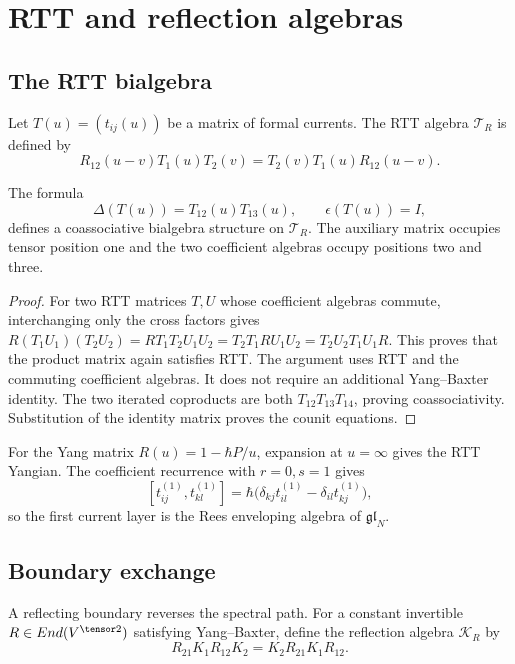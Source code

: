 \chapter{RTT and reflection algebras}
\section{The RTT bialgebra}
Let $T(u)=(t_{ij}(u))$ be a matrix of formal currents.  The RTT algebra $\mathcal T_R$ is defined by
\begin{equation}\label{eq:vol1-rtt-general}
 R_{12}(u-v)T_1(u)T_2(v)
 =T_2(v)T_1(u)R_{12}(u-v).
\end{equation}

\begin{theorem}
The formula
\[
 \Delta(T(u))=T_{12}(u)T_{13}(u),
 \qquad \epsilon(T(u))=I,
\]
defines a coassociative bialgebra structure on $\mathcal T_R$.
The auxiliary matrix occupies tensor position one and the two coefficient algebras occupy positions two and three.
\end{theorem}
\begin{proof}
For two RTT matrices $T,U$ whose coefficient algebras commute, interchanging only the cross factors gives
$R(T_1U_1)(T_2U_2)=RT_1T_2U_1U_2=T_2T_1RU_1U_2=T_2U_2T_1U_1R$.
This proves that the product matrix again satisfies RTT.
The argument uses RTT and the commuting coefficient algebras. It does not require an additional Yang--Baxter identity.
The two iterated coproducts are both $T_{12}T_{13}T_{14}$, proving coassociativity.
Substitution of the identity matrix proves the counit equations.
\end{proof}

For the Yang matrix $R(u)=1-\hbar P/u$, expansion at $u=\infty$ gives the RTT Yangian.  The coefficient recurrence with $r=0,s=1$ gives
\[
 [t_{ij}^{(1)},t_{kl}^{(1)}]
 =\hbar\bigl(\delta_{kj}t_{il}^{(1)}-\delta_{il}t_{kj}^{(1)}\bigr),
\]
so the first current layer is the Rees enveloping algebra of $\mathfrak{gl}_N$.

\section{Boundary exchange}
A reflecting boundary reverses the spectral path.  For a constant invertible $R\in\End(V^{\tensor2})$ satisfying Yang--Baxter, define the reflection algebra $\mathcal K_R$ by
\begin{equation}\label{eq:vol1-reflection}
 R_{21}K_1R_{12}K_2
 =K_2R_{21}K_1R_{12}.
\end{equation}

